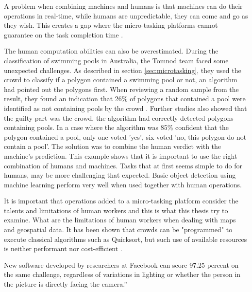 A problem when combining machines and humans is that machines can do their operations in real-time, while humans are unpredictable, they can come and go as they wish. This creates a gap where the micro-tasking platforms cannot guarantee on the task completion time \citep{Difallah2016}. 

The human computation abilities can also be overestimated. During the classification of swimming pools in Australia, the Tomnod team faced some unexpected challenges. As described in section \ref{sec:microtasking}, they used the crowd to classify if a polygon contained a swimming pool or not, an algorithm had pointed out the polygons first. When reviewing a random sample from the result, they found an indication that 26\% of polygons that contained a pool were identified as not containing pools by the crowd \citep{Kostas2016}.  Further studies also showed that the guilty part was the crowd, the algorithm had correctly detected polygons containing pools. In a case where the algorithm was 85\% confident that the polygon contained a pool, only one voted 'yes', six voted 'no, this polygon do not contain a pool'. The solution was to combine the human verdict with the machine's prediction. This example shows that it is important to use the right combination of humans and machines. Tasks that at first seems simple to do for humans, may be more challenging that expected.  Basic object detection using machine learning perform very well when used together with human operations. 

It is important that operations added to a micro-tasking platform consider the talents and limitations of human workers \citep{Franklin2011} and this is what this thesis try to examine. What are the limitations of human workers when dealing with maps and geospatial data. It has been shown that crowds can be "programmed" to execute classical algorithms such as Quicksort, but such use of available resources is neither performant nor cost-efficient \citep{Franklin2011}. 


New software developed by researchers at Facebook can score 97.25 percent on the same challenge, regardless of variations in lighting or whether the person in the picture is directly facing the camera.” %


